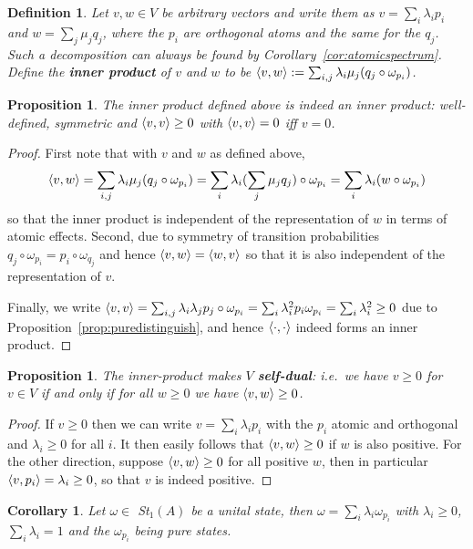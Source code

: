 \documentclass[b5paper,onecolumn,12pt,accepted=2019-05-03, issue=1, volume=1, shorttitle=papers/compositionality-1-1]{compositionalityarticle}
\DeclarePairedDelimiter{\inn}{\langle}{\rangle}
\newcounter{counter}
\numberwithin{counter}{section}
\newtheorem{proposition}[counter]{Proposition}
\newtheorem{definition}[counter]{Definition}
\newtheorem{corollary}[counter]{Corollary}
\begin{document}
\begin{definition}
    Let $v,w \in V$ be arbitrary vectors and write them as $v=\sum_i \lambda_i p_i$ and $w=\sum_j \mu_j q_j$, where the $p_i$ are orthogonal atoms and the same for the $q_j$. Such a decomposition can always be found by Corollary~\ref{cor:atomicspectrum}. Define the \textbf{inner product} of $v$ and $w$ to be $\inn{v,w} := \sum_{i,j} \lambda_i \mu_j (q_j\circ\omega_{p_i})$.
\end{definition}
\begin{proposition}
    The inner product defined above is indeed an inner product: well-defined, symmetric and $\inn{v,v}\geq 0$ with $\inn{v,v}=0$ iff $v=0$.
\end{proposition}
\begin{proof}
    First note that with $v$ and $w$ as defined above, 
    $$\inn{v,w} = \sum_{i,j} \lambda_i \mu_j (q_j\circ\omega_{p_i}) = \sum_i \lambda_i (\sum_j \mu_j q_j)\circ\omega_{p_i} = \sum_i \lambda_i (w\circ\omega_{p_i})$$ 
    so that the inner product is independent of the representation of $w$ in terms of atomic effects. 
    Second, due to symmetry of transition probabilities $q_j\circ\omega_{p_i} = p_i\circ\omega_{q_j}$ and hence $\inn{v,w} = \inn{w,v}$ so that it is also independent of the representation of $v$.

    Finally, we write $\inn{v,v} = \sum_{i,j} \lambda_i \lambda_j p_j\circ\omega_{p_i} = \sum_i \lambda_i^2 p_i\omega_{p_i} = \sum_i \lambda_i^2\geq 0$ due to Proposition~\ref{prop:puredistinguish}, and hence $\inn{\cdot,\cdot}$ indeed forms an inner product.
\end{proof}
\begin{proposition}
    The inner-product makes $V$ \textbf{self-dual}: i.e.\ we have $v\geq 0$ for $v\in V$ if and only if for all $w\geq 0$ we have $\inn{v,w}\geq 0$.
\end{proposition}
\begin{proof}
    If $v\geq 0$ then we can write $v=\sum_i \lambda_i p_i$ with the $p_i$ atomic and orthogonal and $\lambda_i \geq 0$ for all $i$. It then easily follows that $\inn{v,w}\geq 0$ if $w$ is also positive. For the other direction, suppose $\inn{v,w}\geq 0$ for all positive $w$, then in particular $\inn{v,p_i} = \lambda_i \geq 0$, so that $v$ is indeed positive.
\end{proof}
\begin{corollary} \label{cor:purestateconvex}
    Let $\omega\in $ St$_1(A)$ be a unital state, then $\omega = \sum_i \lambda_i \omega_{p_i}$ with $\lambda_i\geq 0$, $\sum_i\lambda_i = 1$ and the $\omega_{p_i}$ being pure states.
\end{corollary}
\end{document}
